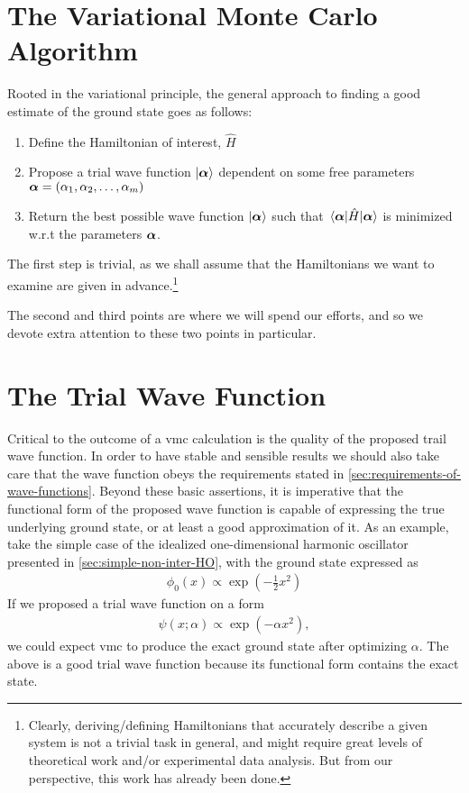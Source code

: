 \documentclass[Thesis.tex]{subfiles}
\begin{document}
\section{The Variational Monte Carlo Algorithm}

Rooted in the variational principle, the general approach to finding a good estimate of
the ground state goes as follows:

\begin{enumerate}
    \item Define the Hamiltonian of interest, $\hat H$
    \item Propose a trial wave function $| \bm{\alpha} \rangle$ dependent on some free parameters
        $\bm{\alpha}=\qty(\alpha_1, \alpha_2,\dots, \alpha_m)$
    \item Return the best possible wave function $| \bm{\alpha} \rangle$ such that $\expval{\hat
        H}{\bm{\alpha}}$ is minimized w.r.t the parameters $\bm{\alpha}$.
\end{enumerate}
The first step is trivial, as we shall assume that the Hamiltonians we want to examine are
given in advance.\footnote{Clearly, deriving/defining Hamiltonians that accurately describe a given
system is not a trivial task in general, and might require great levels of theoretical
work and/or experimental data analysis. But from our perspective, this work has already
been done.}

The second and third points are where we will spend our efforts, and so we devote extra
attention to these two points in particular.


\section{The Trial Wave Function}

Critical to the outcome of a \gls{vmc} calculation is the quality of the proposed trail wave
function. In order to have stable and sensible results we should also take care that the
wave function obeys the requirements stated in
\cref{sec:requirements-of-wave-functions}. Beyond these basic assertions, it is
imperative that the functional form of the proposed wave function is capable of expressing
the true underlying ground state, or at least a good approximation of it. As an example,
take the simple case of the idealized one-dimensional harmonic oscillator presented in
\cref{sec:simple-non-inter-HO}, with the ground state expressed as
\begin{align}
    \phi_0(x) \propto \exp(- \frac{1}{2} x^2)
\end{align}
If we proposed a trial wave function on a form
\begin{align}
    \psi(x; \alpha)\propto \exp(- \alpha x^2),
\end{align}
we could expect \gls{vmc} to produce the exact ground state after optimizing $\alpha$. The above
is a good trial wave function because its functional form contains the exact state.
\end{document}
